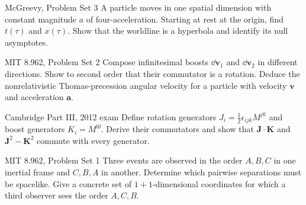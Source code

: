 \begin{exercises}
\begin{exercise}{McGreevy, Problem Set 3}
A particle moves in one spatial dimension with constant magnitude \(a\) of
four-acceleration.  Starting at rest at the origin, find \(t(\tau)\) and
\(x(\tau)\).  Show that the worldline is a hyperbola and identify its null
asymptotes.
\end{exercise}

\begin{exercise}{MIT 8.962, Problem Set 2}
Compose infinitesimal boosts \(\dd\bm v_1\) and \(\dd\bm v_2\) in different
directions.  Show to second order that their commutator is a rotation.  Deduce
the nonrelativistic Thomas-precession angular velocity for a particle with
velocity \(\bm v\) and acceleration \(\bm a\).
\end{exercise}

\begin{exercise}{Cambridge Part III, 2012 exam}
Define rotation generators \(J_i=\tfrac12\epsilon_{ijk}M^{jk}\) and boost
generators \(K_i=M^{0\ii}\).  Derive their commutators and show that
\(\bm J\cdot\bm K\) and \(\bm J^2-\bm K^2\) commute with every generator.
\end{exercise}

\begin{exercise}{MIT 8.962, Problem Set 1}
Three events are observed in the order \(A,B,C\) in one inertial frame and
\(C,B,A\) in another.  Determine which pairwise separations must be spacelike.
Give a concrete set of \(1+1\)-dimensional coordinates for which a third
observer sees the order \(A,C,B\).
\end{exercise}



\end{exercises}

